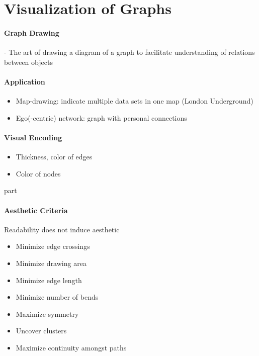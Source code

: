 \documentclass[10pt,a4paper]{article}
\begin{document}
\section{Visualization of Graphs}
	\paragraph{Graph Drawing} - The art of drawing a diagram of a graph to facilitate understanding of relations between objects
	\paragraph{Application}
	\begin{itemize}
		\item Map-drawing: indicate multiple data sets in one map (London Underground)
		\item Ego(-centric) network: graph with personal connections 
	\end{itemize}
	
	\paragraph{Visual Encoding}
	\begin{itemize}
		\item Thickness, color of edges
		\item Color of nodes
	\end{itemize}
	part
	\paragraph{Aesthetic Criteria}
	Readability does not induce aesthetic
	\begin{itemize}
		\item Minimize edge crossings
		\item Minimize drawing area
		\item Minimize edge length
		\item Minimize number of bends
		\item Maximize symmetry
		\item Uncover clusters
		\item Maximize continuity amongst paths
	\end{itemize}
	
\end{document}
